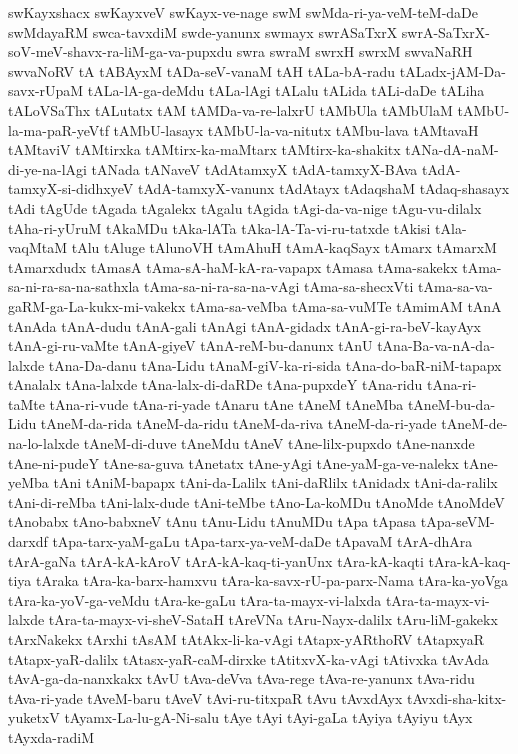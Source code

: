 {swKayxshacx
swKayxveV
swKayx-ve-nage
swM
swMda-ri-ya-veM-teM-daDe
swMdayaRM
swca-tavxdiM
swde-yanunx
swmayx
swrASaTxrX
swrA-SaTxrX-soV-meV-shavx-ra-liM-ga-va-pupxdu
swra
swraM
swrxH
swrxM
swvaNaRH
swvaNoRV
tA
tABAyxM
tADa-seV-vanaM
tAH
tALa-bA-radu
tALadx-jAM-Da-savx-rUpaM
tALa-lA-ga-deMdu
tALa-lAgi
tALalu
tALida
tALi-daDe
tALiha
tALoVSaThx
tALutatx
tAM
tAMDa-va-re-lalxrU
tAMbUla
tAMbUlaM
tAMbU-la-ma-paR-yeVtf
tAMbU-lasayx
tAMbU-la-va-nitutx
tAMbu-lava
tAMtavaH
tAMtaviV
tAMtirxka
tAMtirx-ka-maMtarx
tAMtirx-ka-shakitx
tANa-dA-naM-di-ye-na-lAgi
tANada
tANaveV
tAdAtamxyX
tAdA-tamxyX-BAva
tAdA-tamxyX-si-didhxyeV
tAdA-tamxyX-vanunx
tAdAtayx
tAdaqshaM
tAdaq-shasayx
tAdi
tAgUde
tAgada
tAgalekx
tAgalu
tAgida
tAgi-da-va-nige
tAgu-vu-dilalx
tAha-ri-yUruM
tAkaMDu
tAka-lATa
tAka-lA-Ta-vi-ru-tatxde
tAkisi
tAla-vaqMtaM
tAlu
tAluge
tAlunoVH
tAmAhuH
tAmA-kaqSayx
tAmarx
tAmarxM
tAmarxdudx
tAmasA
tAma-sA-haM-kA-ra-vapapx
tAmasa
tAma-sakekx
tAma-sa-ni-ra-sa-na-sathxla
tAma-sa-ni-ra-sa-na-vAgi
tAma-sa-shecxVti
tAma-sa-va-gaRM-ga-La-kukx-mi-vakekx
tAma-sa-veMba
tAma-sa-vuMTe
tAmimAM
tAnA
tAnAda
tAnA-dudu
tAnA-gali
tAnAgi
tAnA-gidadx
tAnA-gi-ra-beV-kayAyx
tAnA-gi-ru-vaMte
tAnA-giyeV
tAnA-reM-bu-danunx
tAnU
tAna-Ba-va-nA-da-lalxde
tAna-Da-danu
tAna-Lidu
tAnaM-giV-ka-ri-sida
tAna-do-baR-niM-tapapx
tAnalalx
tAna-lalxde
tAna-lalx-di-daRDe
tAna-pupxdeY
tAna-ridu
tAna-ri-taMte
tAna-ri-vude
tAna-ri-yade
tAnaru
tAne
tAneM
tAneMba
tAneM-bu-da-Lidu
tAneM-da-rida
tAneM-da-ridu
tAneM-da-riva
tAneM-da-ri-yade
tAneM-de-na-lo-lalxde
tAneM-di-duve
tAneMdu
tAneV
tAne-lilx-pupxdo
tAne-nanxde
tAne-ni-pudeY
tAne-sa-guva
tAnetatx
tAne-yAgi
tAne-yaM-ga-ve-nalekx
tAne-yeMba
tAni
tAniM-bapapx
tAni-da-Lalilx
tAni-daRlilx
tAnidadx
tAni-da-ralilx
tAni-di-reMba
tAni-lalx-dude
tAni-teMbe
tAno-La-koMDu
tAnoMde
tAnoMdeV
tAnobabx
tAno-babxneV
tAnu
tAnu-Lidu
tAnuMDu
tApa
tApasa
tApa-seVM-darxdf
tApa-tarx-yaM-gaLu
tApa-tarx-ya-veM-daDe
tApavaM
tArA-dhAra
tArA-gaNa
tArA-kA-kAroV
tArA-kA-kaq-ti-yanUnx
tAra-kA-kaqti
tAra-kA-kaq-tiya
tAraka
tAra-ka-barx-hamxvu
tAra-ka-savx-rU-pa-parx-Nama
tAra-ka-yoVga
tAra-ka-yoV-ga-veMdu
tAra-ke-gaLu
tAra-ta-mayx-vi-lalxda
tAra-ta-mayx-vi-lalxde
tAra-ta-mayx-vi-sheV-SataH
tAreVNa
tAru-Nayx-dalilx
tAru-liM-gakekx
tArxNakekx
tArxhi
tAsAM
tAtAkx-li-ka-vAgi
tAtapx-yARthoRV
tAtapxyaR
tAtapx-yaR-dalilx
tAtasx-yaR-caM-dirxke
tAtitxvX-ka-vAgi
tAtivxka
tAvAda
tAvA-ga-da-nanxkakx
tAvU
tAva-deVva
tAva-rege
tAva-re-yanunx
tAva-ridu
tAva-ri-yade
tAveM-baru
tAveV
tAvi-ru-titxpaR
tAvu
tAvxdAyx
tAvxdi-sha-kitx-yuketxV
tAyamx-La-lu-gA-Ni-salu
tAye
tAyi
tAyi-gaLa
tAyiya
tAyiyu
tAyx
tAyxda-radiM
}
